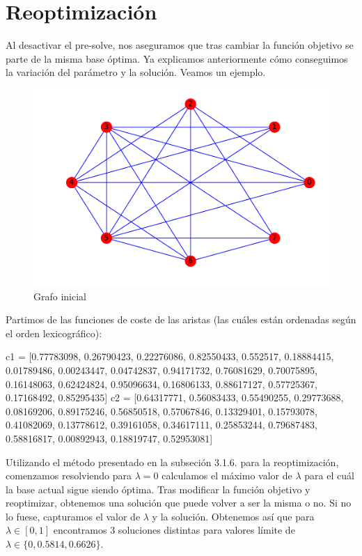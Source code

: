 \documentclass[twoside,a4paper,openright,12pt]{book}
\begin{document}
\newpage
\section{Reoptimización}
Al desactivar el pre-solve, nos aseguramos que tras cambiar la función objetivo se parte de la misma base óptima. Ya explicamos anteriormente cómo conseguimos la variación del parámetro y la solución. Veamos un ejemplo.
\begin{figure}[h!]
\centering
\includegraphics[scale=0.5]{opt}
\caption{Grafo inicial}
\end{figure}

Partimos de las funciones de coste de las aristas (las cuáles están ordenadas según el orden lexicográfico):
\begin{pythone}
c1 = [0.77783098, 0.26790423, 0.22276086, 0.82550433, 0.552517, 0.18884415, 0.01789486, 0.00243447, 0.04742837, 0.94171732, 0.76081629, 0.70075895, 0.16148063, 0.62424824, 0.95096634, 0.16806133, 0.88617127, 0.57725367, 0.17168492, 0.85295435]
c2 = [0.64317771, 0.56083433, 0.55490255, 0.29773688, 0.08169206, 0.89175246, 0.56850518, 0.57067846, 0.13329401, 0.15793078, 0.41082069, 0.13778612, 0.39161058, 0.34617111, 0.25853244, 0.79687483, 0.58816817, 0.00892943, 0.18819747, 0.52953081]
\end{pythone}
Utilizando el método presentado en la subseción 3.1.6. para la reoptimización, comenzamos resolviendo para $\lambda=0$ calculamos el máximo valor de $\lambda$ para el cuál la base actual sigue siendo óptima. Tras modificar la función objetivo y reoptimizar, obtenemos una solución que puede volver a ser la misma o no. Si no lo fuese, capturamos el valor de $\lambda$ y la solución. Obtenemos así que para $\lambda\in [0,1]$ encontramos 3 soluciones distintas para valores límite de $\lambda \in \{0,0.5814,0.6626\}$.
\end{document}
